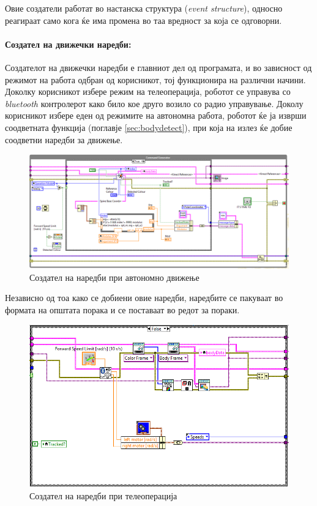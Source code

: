\documentclass[12pt]{article}
\begin{document}
      Овие создатели работат во настанска структура (\textit{event structure}), односно реагираат само кога ќе има промена во таа вредност за која се одговорни.

    \paragraph{Создател на движечки наредби:\\}
      Создателот на движечки наредби е главниот дел од програмата, и во зависност од режимот на работа одбран од корисникот, тој функционира на различни начини. Доколку корисникот избере режим на телеоперација, роботот се управува со \textit{bluetooth} контролерот како било кое друго возило со радио управување. Доколу корисникот избере еден од режимите на автономна работа, роботот ќе ја изврши соодветната функција (поглавје \ref{sec:bodydetect}), при која на излез ќе добие соодветни наредби за движење.
      \begin{figure}[H]
        \centering
        \includegraphics[angle=-90, scale=0.65]{./images/command_generator_true.PNG}
        \caption{Создател на наредби при автономно движење}
      \end{figure}
      Независно од тоа како се добиени овие наредби, наредбите се пакуваат во формата на општата порака и се поставаат во редот за пораки.
      \begin{figure}[H]
        \centering
        \includegraphics[width=0.8\linewidth]{./images/command_generator_false.PNG}
        \caption{Создател на наредби при телеоперација}
      \end{figure}
    \bigbreak
\end{document}
